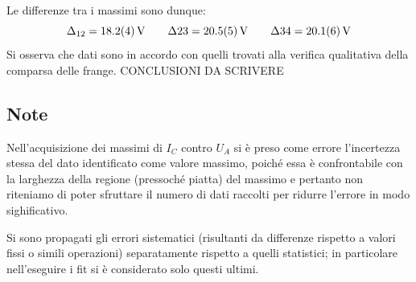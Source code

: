 	Le differenze tra i massimi sono dunque:
	$$\Delta_{12}=\SI{18.2\pm 0.4}{\volt} \qquad \Delta{23}=\SI{20.5 \pm 0.5}{\volt} \qquad \Delta{34}=\SI{20.1 \pm 0.6}{\volt}$$
	Si osserva che dati sono in accordo con quelli trovati alla
	verifica qualitativa della comparsa delle frange.
	CONCLUSIONI DA SCRIVERE

\subsection{Note}
Nell'acquisizione dei massimi di $I_C$ contro $U_A$ si è preso come errore
l'incertezza stessa del dato identificato come valore massimo, poiché essa è confrontabile con
la larghezza della regione (pressoché piatta) del massimo e pertanto non riteniamo
di poter sfruttare il numero di dati raccolti per ridurre l'errore in modo sighificativo.

Si sono propagati gli errori sistematici (risultanti da differenze rispetto a valori fissi
o simili operazioni) separatamente rispetto a quelli statistici; in particolare
nell'eseguire i fit si è considerato solo questi ultimi.
